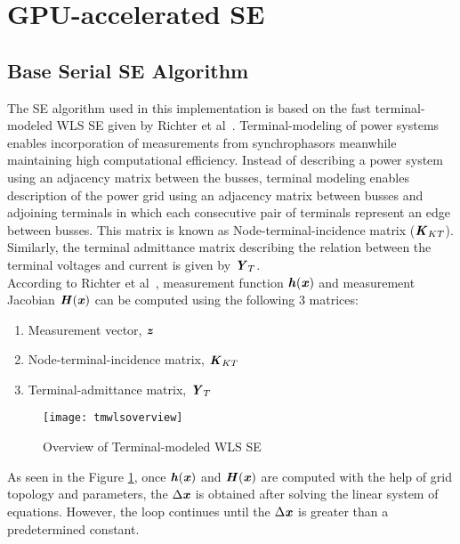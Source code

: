 \documentclass[thesis.tex]{subfiles}
\begin{document}
\section{GPU-accelerated SE}\label{sec:accse}
\subsection{Base Serial SE Algorithm}\label{sec:bsealgo}
The SE algorithm used in this implementation is based on the fast terminal-modeled WLS SE given by Richter et al~\cite{Richter}. Terminal-modeling of power systems enables incorporation of measurements from synchrophasors meanwhile maintaining high computational efficiency. Instead of describing a power system using an adjacency matrix between the busses, terminal modeling enables description of the power grid using an adjacency matrix between busses and adjoining terminals in which each consecutive pair of terminals represent an edge between busses. This matrix is known as Node-terminal-incidence matrix ($\textbf{\textit{K}}_{KT}$). Similarly, the terminal admittance matrix describing the relation between the terminal voltages and current is given by $\textbf{\textit{Y}}_{T}$.\\
According to Richter et al~\cite{Richter}, measurement function $\textbf{\textit{h}}(\textbf{\textit{x}})$ and measurement Jacobian $\textbf{\textit{H}}(\textbf{\textit{x}})$ can be computed using the following 3 matrices:
\begin{enumerate}
	\item Measurement vector, $\textbf{\textit{z}}$
	\item Node-terminal-incidence matrix, $\textbf{\textit{K}}_{KT}$ 
	\item Terminal-admittance matrix, $\textbf{\textit{Y}}_{T}$  
\end{enumerate}

\begin{figure}[H]
	\centering
	\texttt{[image: tmwlsoverview]}
	\caption{Overview of Terminal-modeled WLS SE}
	\label{fig:tmwlsoverview}
\end{figure}

As seen in the Figure \ref{fig:tmwlsoverview}, once $\textbf{\textit{h}}(\textbf{\textit{x}})$ and $\textbf{\textit{H}}(\textbf{\textit{x}})$ are computed with the help of grid topology and parameters, the $\Delta \textbf{\textit{x}}$ is obtained after solving the linear system of equations. However, the loop continues until the $\Delta \textbf{\textit{x}}$ is greater than a predetermined constant. 
\end{document}
